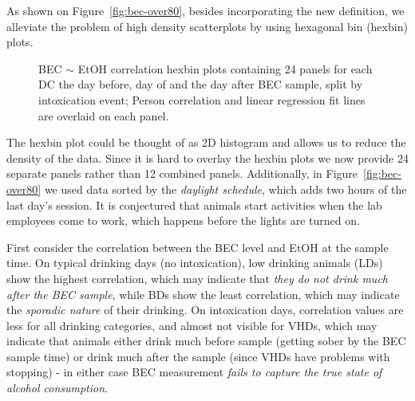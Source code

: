 	As shown on Figure~\ref{fig:bec-over80}, besides incorporating the new definition, we alleviate the problem of high density scatterplots by using hexagonal bin (hexbin) plots.
	\begin{figure}[ht]
		\centering
		\caption{BEC $\sim$ EtOH correlation hexbin plots containing 24 panels for each DC the day before, day of and the day after BEC sample, split by intoxication event; Person correlation and linear regression fit lines are overlaid on each panel.}
		\label{fig:bec-more80}
	\end{figure}
	
	The hexbin plot could be thought of as 2D histogram and allows us to reduce the density of the data. Since it is hard to overlay the hexbin plots we now provide 24 separate panels rather than 12 combined panels. Additionally, in Figure~\ref{fig:bec-over80} we used data sorted by the \textit{daylight schedule}, which adds two hours of the last day's session. It is conjectured that animals start activities when the lab employees come to work, which happens before the lights are turned on. 
	
	First consider the correlation between the BEC level and EtOH at the sample time. On typical drinking days (no intoxication), low drinking animals (LDs) show the highest correlation, which may indicate that \textit{they do not drink much after the BEC sample}, while BDs show the least correlation, which may indicate the \textit{sporadic nature} of their drinking. On intoxication days, correlation values are less for all drinking categories, and almost not visible for VHDs, which may indicate that animals either drink much before sample (getting sober by the BEC sample time) or drink much after the sample (since VHDs have problems with stopping) - in either case BEC measurement \textit{fails to capture the true state of alcohol consumption}.
	
